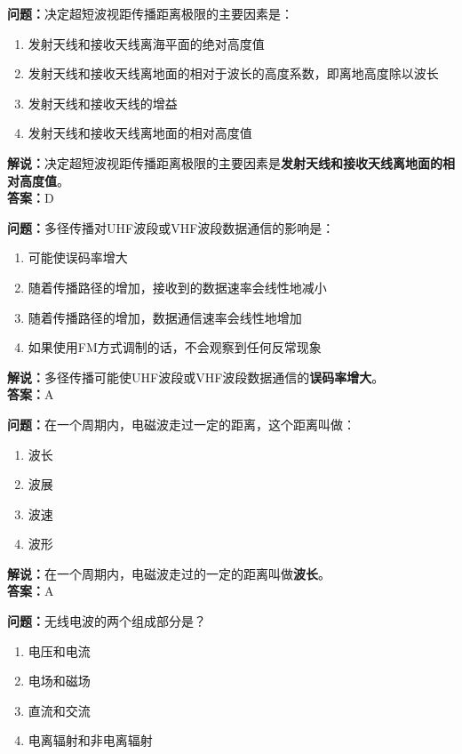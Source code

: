 \textbf{问题：}决定超短波视距传播距离极限的主要因素是：

\begin{enumerate}[label=\Alph*), leftmargin=1.5cm]
	\item 发射天线和接收天线离海平面的绝对高度值
	\item 发射天线和接收天线离地面的相对于波长的高度系数，即离地高度除以波长
	\item 发射天线和接收天线的增益
	\item 发射天线和接收天线离地面的相对高度值
\end{enumerate}

\textbf{解说：}决定超短波视距传播距离极限的主要因素是\textbf{发射天线和接收天线离地面的相对高度值}。\\\textbf{答案：}D



\textbf{问题：}多径传播对UHF波段或VHF波段数据通信的影响是：

\begin{enumerate}[label=\Alph*), leftmargin=1.5cm]
	\item 可能使误码率增大
	\item 随着传播路径的增加，接收到的数据速率会线性地减小
	\item 随着传播路径的增加，数据通信速率会线性地增加
	\item 如果使用FM方式调制的话，不会观察到任何反常现象
\end{enumerate}

\textbf{解说：}多径传播可能使UHF波段或VHF波段数据通信的\textbf{误码率增大}。\\\textbf{答案：}A



\textbf{问题：}在一个周期内，电磁波走过一定的距离，这个距离叫做：

\begin{enumerate}[label=\Alph*), leftmargin=1.5cm]
	\item 波长
	\item 波展
	\item 波速
	\item 波形
\end{enumerate}

\textbf{解说：}在一个周期内，电磁波走过的一定的距离叫做\textbf{波长}。\\\textbf{答案：}A



\textbf{问题：}无线电波的两个组成部分是？

\begin{enumerate}[label=\Alph*), leftmargin=1.5cm]
	\item 电压和电流
	\item 电场和磁场
	\item 直流和交流
	\item 电离辐射和非电离辐射
\end{enumerate}

